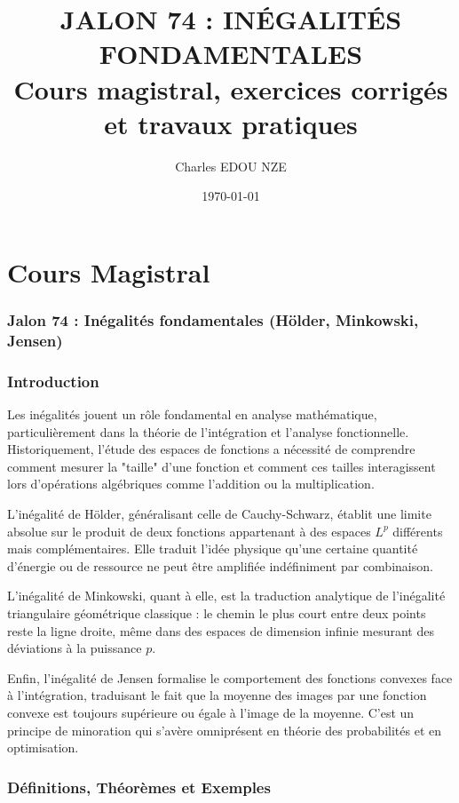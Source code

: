 \documentclass[11pt,a4paper]{article}
\title{\Huge JALON 74 : INÉGALITÉS FONDAMENTALES \\ \large Cours magistral, exercices corrigés et travaux pratiques}
\author{\Large Charles EDOU NZE}
\date{\today}
\begin{document}
\maketitle
\tableofcontents
\newpage

\part{Cours Magistral}


\section*{Jalon 74 : Inégalités fondamentales (Hölder, Minkowski, Jensen)}

\section*{Introduction}

Les inégalités jouent un rôle fondamental en analyse mathématique, particulièrement dans la théorie de l'intégration et l'analyse fonctionnelle. Historiquement, l'étude des espaces de fonctions a nécessité de comprendre comment mesurer la "taille" d'une fonction et comment ces tailles interagissent lors d'opérations algébriques comme l'addition ou la multiplication.

L'inégalité de Hölder, généralisant celle de Cauchy-Schwarz, établit une limite absolue sur le produit de deux fonctions appartenant à des espaces $L^p$ différents mais complémentaires. Elle traduit l'idée physique qu'une certaine quantité d'énergie ou de ressource ne peut être amplifiée indéfiniment par combinaison.

L'inégalité de Minkowski, quant à elle, est la traduction analytique de l'inégalité triangulaire géométrique classique : le chemin le plus court entre deux points reste la ligne droite, même dans des espaces de dimension infinie mesurant des déviations à la puissance $p$.

Enfin, l'inégalité de Jensen formalise le comportement des fonctions convexes face à l'intégration, traduisant le fait que la moyenne des images par une fonction convexe est toujours supérieure ou égale à l'image de la moyenne. C'est un principe de minoration qui s'avère omniprésent en théorie des probabilités et en optimisation.

\section*{Définitions, Théorèmes et Exemples}
\end{document}
